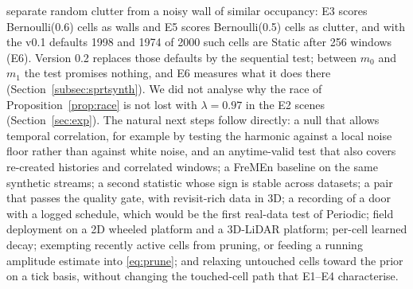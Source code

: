 separate random clutter from a noisy wall of similar occupancy: E3 scores Bernoulli(0.6) cells as walls and E5 scores Bernoulli(0.5) cells as clutter, and with the v0.1 defaults 1998 and 1974 of 2000 such cells are Static after 256 windows (E6). Version 0.2 replaces those defaults by the sequential test; between $m_0$ and $m_1$ the test promises nothing, and E6 measures what it does there (Section~\ref{subsec:sprtsynth}). We did not analyse why the race of Proposition~\ref{prop:race} is not lost with $\lambda{=}0.97$ in the E2 scenes (Section~\ref{sec:exp}). The natural next steps follow directly: a null that allows temporal correlation, for example by testing the harmonic against a local noise floor rather than against white noise, and an anytime-valid test that also covers re-created histories and correlated windows; a FreMEn baseline on the same synthetic streams; a second statistic whose sign is stable across datasets; a pair that passes the quality gate, with revisit-rich data in 3D; a recording of a door with a logged schedule, which would be the first real-data test of Periodic; field deployment on a 2D wheeled platform and a 3D-LiDAR platform; per-cell learned decay; exempting recently active cells from pruning, or feeding a running amplitude estimate into \eqref{eq:prune}; and relaxing untouched cells toward the prior on a tick basis, without changing the touched-cell path that E1--E4 characterise.
